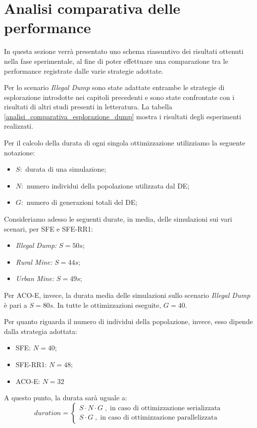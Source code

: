 \newpage
\section{Analisi comparativa delle performance}

In questa sezione verrà presentato uno schema riassuntivo dei risultati ottenuti nella fase sperimentale, al fine di poter effettuare una comparazione tra le performance registrate dalle varie strategie adottate.

Per lo scenario \textit{Illegal Dump} sono state adattate entrambe le strategie di esplorazione introdotte nei capitoli precedenti e sono state confrontate con i risultati di altri studi presenti in letteratura.
La tabella \ref{analisi_comparativa_esplorazione_dump} mostra i risultati degli esperimenti realizzati.

Per il calcolo della durata di ogni singola ottimizzazione utilizziamo la seguente notazione:
\begin{itemize}
    \item $S:$ durata di una simulazione;
    \item $N:$ numero individui della popolazione utilizzata dal DE;
    \item $G:$ numero di generazioni totali del DE;
\end{itemize}
Consideriamo adesso le seguenti durate, in media, delle simulazioni sui vari scenari, per SFE e SFE-RR1:
\begin{itemize}
    \item \textit{Illegal Dump: }$S = 50s$;
    \item \textit{Rural Mine: }$S = 44s$;
    \item \textit{Urban Mine: }$S = 49s$;
\end{itemize}
Per ACO-E, invece, la durata media delle simulazioni sullo scenario \textit{Illegal Dump} è pari a $S = 80s$.
In tutte le ottimizzazioni eseguite, $G=40$.

Per quanto riguarda il numero di individui della popolazione, invece, esso dipende dalla strategia adottata:
\begin{itemize}
    \item SFE: $N = 40$;
    \item SFE-RR1: $N = 48$;
    \item ACO-E: $N = 32$
\end{itemize}

A questo punto, la durata sarà uguale a:
\begin{equation*}
    duration = \begin{cases}
        S \cdot N \cdot G \; , \; \text{in caso di ottimizzazione serializzata}\\
        S  \cdot G \; , \; \text{in caso di ottimizzazione parallelizzata}
    \end{cases}   
\end{equation*}

